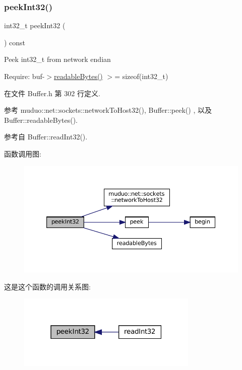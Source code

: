 \subsubsection{\texorpdfstring{peek\+Int32()}{peekInt32()}}
{\footnotesize\ttfamily int32\+\_\+t peek\+Int32 (\begin{DoxyParamCaption}{ }\end{DoxyParamCaption}) const\hspace{0.3cm}{\ttfamily [inline]}}

Peek int32\+\_\+t from network endian

Require\+: buf-\/$>$\hyperlink{classmuduo_1_1net_1_1Buffer_afba1d23196411daa43950fdbbff6d724}{readable\+Bytes()} $>$= sizeof(int32\+\_\+t) 

在文件 Buffer.\+h 第 302 行定义.



参考 muduo\+::net\+::sockets\+::network\+To\+Host32(), Buffer\+::peek() , 以及 Buffer\+::readable\+Bytes().



参考自 Buffer\+::read\+Int32().

函数调用图\+:
\nopagebreak
\begin{figure}[H]
\begin{center}
\leavevmode
\includegraphics[width=350pt]{classmuduo_1_1net_1_1Buffer_afefe12caa1ed837ffb7e967d44e19af9_cgraph}
\end{center}
\end{figure}
这是这个函数的调用关系图\+:
\nopagebreak
\begin{figure}[H]
\begin{center}
\leavevmode
\includegraphics[width=244pt]{classmuduo_1_1net_1_1Buffer_afefe12caa1ed837ffb7e967d44e19af9_icgraph}
\end{center}
\end{figure}
\mbox{\label{classmuduo_1_1net_1_1Buffer_a78f18c2f695bc9fb75781596a16d9416}} 
